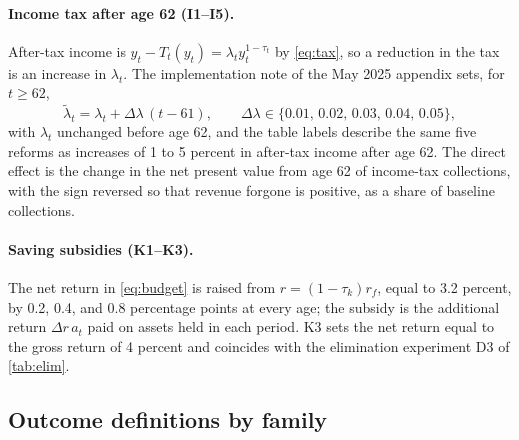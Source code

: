 \paragraph{Income tax after age 62 (I1--I5).}
After-tax income is $y_t-T_t(y_t)=\lambda_t y_t^{1-\tau_t}$ by \eqref{eq:tax}, so a reduction in the tax is an increase in $\lambda_t$. The implementation note of the May 2025 appendix sets, for $t\geq 62$,
\begin{equation}\label{eq:taxreform}
\tilde{\lambda}_t=\lambda_t+\Delta\lambda\,(t-61),\qquad \Delta\lambda\in\{0.01,\,0.02,\,0.03,\,0.04,\,0.05\},
\end{equation}
with $\lambda_t$ unchanged before age 62, and the table labels describe the same five reforms as increases of 1 to 5 percent in after-tax income after age 62. %
The direct effect is the change in the net present value from age 62 of income-tax collections, with the sign reversed so that revenue forgone is positive, as a share of baseline collections. %

\paragraph{Saving subsidies (K1--K3).}
The net return in \eqref{eq:budget} is raised from $r=(1-\tau_k)r_f$, equal to 3.2 percent, by 0.2, 0.4, and 0.8 percentage points at every age; the subsidy is the additional return $\Delta r\,a_t$ paid on assets held in each period. %
K3 sets the net return equal to the gross return of 4 percent and coincides with the elimination experiment D3 of \autoref{tab:elim}. %

\subsection{Outcome definitions by family}\label{app:outcomes}

